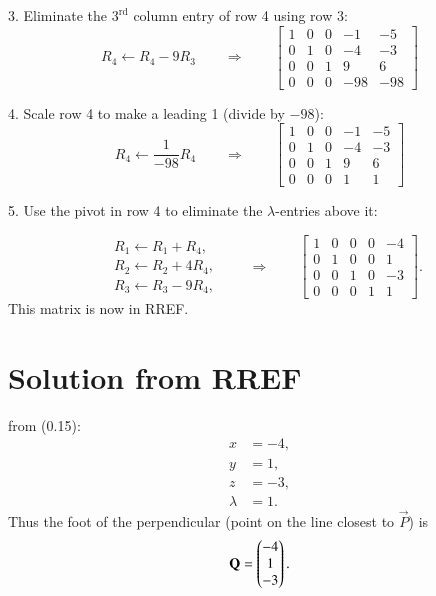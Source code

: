 \documentclass[journal]{IEEEtran}
\begin{document}
3. Eliminate the \(3^{\text{rd}}\) column entry of row 4 using row 3:
\begin{equation}\label{eq:step3}
R_4 \leftarrow R_4 - 9R_3
\qquad\Longrightarrow\qquad
\left[\begin{array}{cccc|c}
1 & 0 & 0 & -1 & -5\\[4pt]
0 & 1 & 0 & -4 & -3\\[4pt]
0 & 0 & 1 & 9  & 6 \\[4pt]
0 & 0 & 0 & -98 & -98
\end{array}\right]
\end{equation}

4. Scale row 4 to make a leading 1 (divide by \(-98\)):
\begin{equation}\label{eq:step4}
R_4 \leftarrow \frac{1}{-98}R_4
\qquad\Longrightarrow\qquad
\left[\begin{array}{cccc|c}
1 & 0 & 0 & -1 & -5\\[4pt]
0 & 1 & 0 & -4 & -3\\[4pt]
0 & 0 & 1 & 9  & 6 \\[4pt]
0 & 0 & 0 & 1 & 1
\end{array}\right]
\end{equation}


5. Use the pivot in row 4 to eliminate the \(\lambda\)-entries above it:

\begin{equation}\label{eq:step5}
\begin{aligned}
& R_1 \leftarrow R_1 + R_4,\\
& R_2 \leftarrow R_2 + 4R_4,\\
& R_3 \leftarrow R_3 - 9R_4,
\end{aligned}
\qquad\Longrightarrow\qquad
\left[\begin{array}{cccc|c}
1 & 0 & 0 & 0 & -4\\[4pt]
0 & 1 & 0 & 0 & 1\\[4pt]
0 & 0 & 1 & 0 & -3\\[4pt]
0 & 0 & 0 & 1 & 1
\end{array}\right].
\end{equation}
This matrix is now in RREF.

\section*{Solution from RREF}
 from (0.15):
\begin{align}
x &= -4, \\
y &= 1, \\
z &= -3, \\
\lambda &= 1.
\end{align}
Thus the foot of the perpendicular (point on the line closest to \(\vec{P}\)) is
\begin{equation}
\mathbf{Q}=\begin{pmatrix}-4\\1\\-3\end{pmatrix}.
\end{equation}
\end{document}
